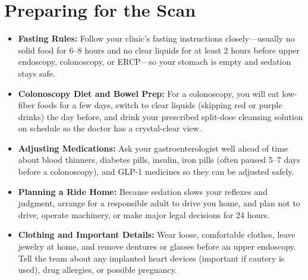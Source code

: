 \section{Preparing for the Scan}
\begin{itemize}
\item \textbf{Fasting Rules:} Follow your clinic's fasting instructions closely---usually no solid food for 6--8 hours and no clear liquids for at least 2 hours before upper endoscopy, colonoscopy, or ERCP---so your stomach is empty and sedation stays safe.
\item \textbf{Colonoscopy Diet and Bowel Prep:} For a colonoscopy, you will eat low-fiber foods for a few days, switch to clear liquids (skipping red or purple drinks) the day before, and drink your prescribed split-dose cleansing solution on schedule so the doctor has a crystal-clear view.
\item \textbf{Adjusting Medications:} Ask your gastroenterologist well ahead of time about blood thinners, diabetes pills, insulin, iron pills (often paused 5--7 days before a colonoscopy), and GLP-1 medicines so they can be adjusted safely.
\item \textbf{Planning a Ride Home:} Because sedation slows your reflexes and judgment, arrange for a responsible adult to drive you home, and plan not to drive, operate machinery, or make major legal decisions for 24 hours.
\item \textbf{Clothing and Important Details:} Wear loose, comfortable clothes, leave jewelry at home, and remove dentures or glasses before an upper endoscopy. Tell the team about any implanted heart devices (important if cautery is used), drug allergies, or possible pregnancy.
\end{itemize}


